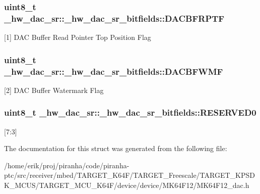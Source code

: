 \subsubsection[{\texorpdfstring{D\+A\+C\+B\+F\+R\+P\+TF}{DACBFRPTF}}]{\setlength{\rightskip}{0pt plus 5cm}uint8\+\_\+t \+\_\+hw\+\_\+dac\+\_\+sr\+::\+\_\+hw\+\_\+dac\+\_\+sr\+\_\+bitfields\+::\+D\+A\+C\+B\+F\+R\+P\+TF}\hypertarget{struct__hw__dac__sr_1_1__hw__dac__sr__bitfields_a02d266a08e71ff7707f6a6300bf6661e}{}\label{struct__hw__dac__sr_1_1__hw__dac__sr__bitfields_a02d266a08e71ff7707f6a6300bf6661e}
\mbox{[}1\mbox{]} D\+AC Buffer Read Pointer Top Position Flag 
\subsubsection[{\texorpdfstring{D\+A\+C\+B\+F\+W\+MF}{DACBFWMF}}]{\setlength{\rightskip}{0pt plus 5cm}uint8\+\_\+t \+\_\+hw\+\_\+dac\+\_\+sr\+::\+\_\+hw\+\_\+dac\+\_\+sr\+\_\+bitfields\+::\+D\+A\+C\+B\+F\+W\+MF}\hypertarget{struct__hw__dac__sr_1_1__hw__dac__sr__bitfields_a31fbb213274eca4dbc3e60cb2b789889}{}\label{struct__hw__dac__sr_1_1__hw__dac__sr__bitfields_a31fbb213274eca4dbc3e60cb2b789889}
\mbox{[}2\mbox{]} D\+AC Buffer Watermark Flag 
\subsubsection[{\texorpdfstring{R\+E\+S\+E\+R\+V\+E\+D0}{RESERVED0}}]{\setlength{\rightskip}{0pt plus 5cm}uint8\+\_\+t \+\_\+hw\+\_\+dac\+\_\+sr\+::\+\_\+hw\+\_\+dac\+\_\+sr\+\_\+bitfields\+::\+R\+E\+S\+E\+R\+V\+E\+D0}\hypertarget{struct__hw__dac__sr_1_1__hw__dac__sr__bitfields_ad4b00e1501283f51ee0daba73e4ac4ad}{}\label{struct__hw__dac__sr_1_1__hw__dac__sr__bitfields_ad4b00e1501283f51ee0daba73e4ac4ad}
\mbox{[}7\+:3\mbox{]} 

The documentation for this struct was generated from the following file\+:\begin{DoxyCompactItemize}
\item 
/home/erik/proj/piranha/code/piranha-\/ptc/src/receiver/mbed/\+T\+A\+R\+G\+E\+T\+\_\+\+K64\+F/\+T\+A\+R\+G\+E\+T\+\_\+\+Freescale/\+T\+A\+R\+G\+E\+T\+\_\+\+K\+P\+S\+D\+K\+\_\+\+M\+C\+U\+S/\+T\+A\+R\+G\+E\+T\+\_\+\+M\+C\+U\+\_\+\+K64\+F/device/device/\+M\+K64\+F12/M\+K64\+F12\+\_\+dac.\+h\end{DoxyCompactItemize}
